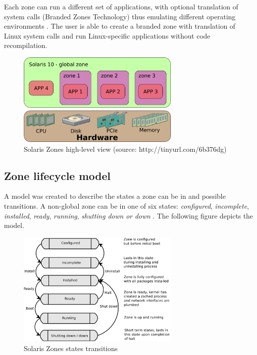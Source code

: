 \documentclass[11pt]{book}
\begin{document}
        Each zone can run a different set of applications, with optional translation of system calls (Branded Zones
        Technology) thus emulating different operating environments \cite{sag}. The user is able to create a branded
        zone with translation of Linux system calls and run Linux-specific applications without code recompilation.

        \begin{figure}[H]
          \begin{center}
            \includegraphics[width=0.7\textwidth]{img/solaris/zones.png}
          \end{center}

          \caption{Solaris Zones high-level view (source: http://tinyurl.com/6b376dg)}
        \end{figure}


      \subsection{Zone lifecycle model}
      \label{sub:}

        A model was created to describe the states a zone can be in and possible transitions. A non-global zone can be
        in one of six states: \textit{configured}, \textit{incomplete}, \textit{installed}, \textit{ready},
        \textit{running}, \textit{shutting down or down} \cite{sag}. The following figure depicts the model.

        \begin{figure}[H]
          \begin{center}
            \includegraphics[width=0.7\textwidth]{img/solaris/zone_states.pdf}
          \end{center}

          \caption{Solaris Zones states transitions}
        \end{figure}
\end{document}
